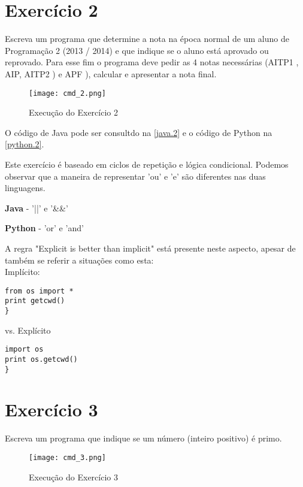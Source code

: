 \documentclass[a4paper]{report}
\begin{document}
\clearpage

\section{Exercício 2}
\label{exercicio2}

Escreva um programa que determine a nota na época normal de um aluno de Programação 2 (2013 / 2014) e que indique se o aluno está aprovado ou reprovado. Para esse fim o programa deve pedir as 4 notas necessárias (AITP1 , AIP, AITP2 ) e APF ), calcular e apresentar a nota final.


\begin{figure}[ht]
 \texttt{[image: cmd\_2.png]}
 \caption{Execução do Exercício 2}
 \label{cmd2}
\end{figure}


O código de Java pode ser consultdo na \autoref{java.2} e o código de Python na \autoref{python.2}.

Este exercício é baseado em ciclos de repetição e lógica condicional.
Podemos observar que a maneira de representar 'ou' e 'e' são diferentes nas duas linguagens.

    \begin{description}
        \item \textbf{Java} - '||' e '\&\&'
        \item \textbf{Python} - 'or' e 'and'
    \end{description}
    
A regra "\gls{Explicit is better than implicit}" está presente neste aspecto, apesar de também se referir a situações como esta:
\\[5pt]
Implícito:
\begin{lstlisting}
from os import *
print getcwd()
}
\end{lstlisting}
vs.
Explícito
\begin{lstlisting}
import os
print os.getcwd()
}
\end{lstlisting}
\clearpage

\section{Exercício 3}
\label{exercicio3}

Escreva um programa que indique se um número (inteiro positivo) é primo.

\begin{figure}[ht]
 \texttt{[image: cmd\_3.png]}
 \caption{Execução do Exercício 3}
 \label{cmd3}
\end{figure}
\end{document}
